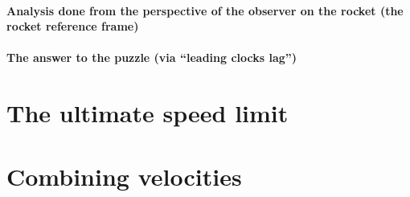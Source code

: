 \documentclass[pagesize,headsepline,10pt,parskip=half]{scrreprt}
\begin{document}
      \paragraph{Analysis done from the perspective of the observer on the rocket (the rocket reference frame)}
      \paragraph{The answer to the puzzle (via “leading clocks lag”)}

    \section{The ultimate speed limit}
    \section{Combining velocities}

  \begingroup
    \printbibliography[heading=lit]
  \endgroup
\end{document}
